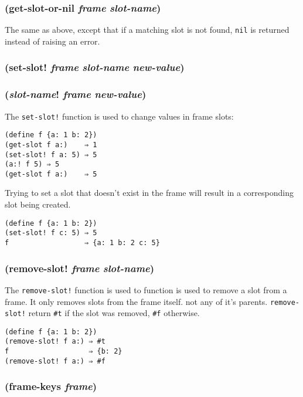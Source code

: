 \documentclass{article}
\begin{document}
\subsubsection{(get-slot-or-nil \emph{frame} \emph{slot-name})}

The same as above, except that if a matching slot is not found, \verb|nil| is returned
instead of raising an error.

\subsubsection{(set-slot! \emph{frame} \emph{slot-name} \emph{new-value})}

\subsubsection{(\emph{slot-name}! \emph{frame} \emph{new-value})}

The \verb|set-slot!| function is used to change values in frame slots:

\begin{verbatim}
(define f {a: 1 b: 2})
(get-slot f a:)    ⇒ 1
(set-slot! f a: 5) ⇒ 5
(a:! f 5) ⇒ 5
(get-slot f a:)    ⇒ 5
\end{verbatim}

Trying to set a slot that doesn’t exist in the frame will result in a corresponding slot being
created.

\begin{verbatim}
(define f {a: 1 b: 2})
(set-slot! f c: 5) ⇒ 5
f                  ⇒ {a: 1 b: 2 c: 5}
\end{verbatim}

\subsubsection{(remove-slot! \emph{frame} \emph{slot-name})}

The \verb|remove-slot!| function is used to function is used to remove a slot from a frame.
It only removes slots from the frame itself. not any of it's parents. \verb|remove-slot!|
return \verb|#t| if the slot was removed, \verb|#f| otherwise.

\begin{verbatim}
(define f {a: 1 b: 2})
(remove-slot! f a:) ⇒ #t
f                   ⇒ {b: 2}
(remove-slot! f a:) ⇒ #f
\end{verbatim}

\subsubsection{(frame-keys \emph{frame})}
\end{document}
